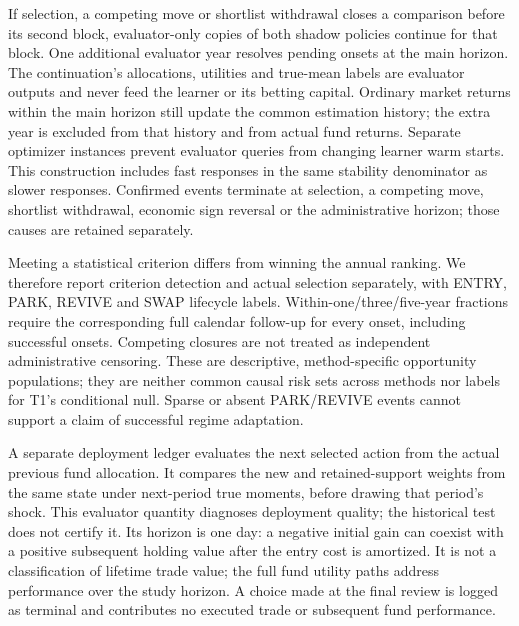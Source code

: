 If selection, a competing move or shortlist withdrawal closes a comparison
before its second block, evaluator-only copies of both shadow policies
continue for that block. One additional evaluator year resolves pending
onsets at the main horizon. The continuation's allocations, utilities and
true-mean labels are evaluator outputs and never feed the learner or its
betting capital. Ordinary market returns within the main horizon still update
the common estimation history; the extra year is excluded from that history
and from actual fund returns. Separate optimizer
instances prevent evaluator queries from changing learner warm starts.
This construction includes fast responses in the same stability denominator
as slower responses. Confirmed events terminate at selection, a competing
move, shortlist withdrawal, economic sign reversal or the administrative
horizon; those causes are retained separately.

Meeting a statistical criterion differs from winning the annual ranking.
We therefore report criterion detection and actual selection separately, with
ENTRY, PARK, REVIVE and SWAP lifecycle labels. Within-one/three/five-year
fractions require the corresponding full calendar follow-up for every onset,
including successful onsets. Competing closures are not treated as independent
administrative censoring. These are descriptive, method-specific opportunity
populations; they are neither common causal risk sets across methods nor
labels for T1's conditional null. Sparse or absent PARK/REVIVE events cannot
support a claim of successful regime adaptation.

A separate deployment ledger evaluates the next selected action from the
actual previous fund allocation. It compares the new and retained-support
weights from the same state under next-period true moments, before drawing
that period's shock. This evaluator quantity diagnoses deployment quality;
the historical test does not certify it. Its horizon is one day: a negative
initial gain can coexist with a positive subsequent holding value after the
entry cost is amortized. It is not a classification of lifetime trade value;
the full fund utility paths address performance over the study horizon.
A choice made at the final review
is logged as terminal and contributes no executed trade or subsequent fund
performance.

